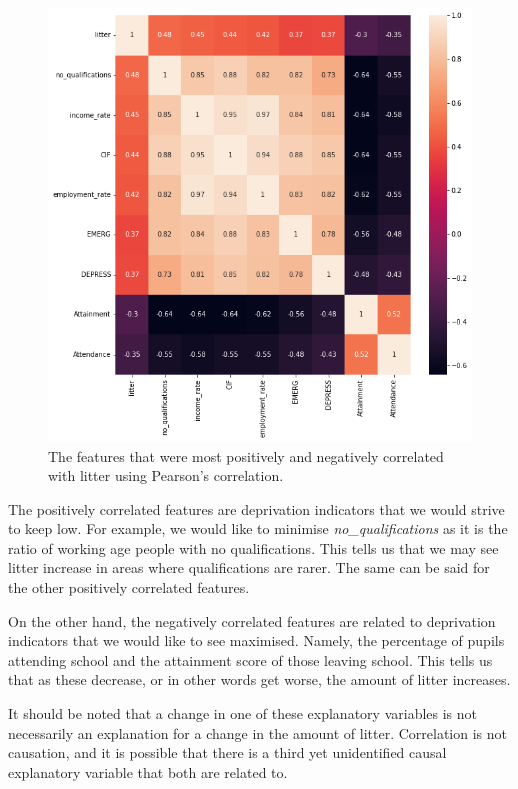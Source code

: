 \documentclass{thesis}
\begin{document}
\begin{figure}[h!]
    \centering
    \includegraphics[scale=0.45]{images/corr-matrix.png}
    \caption{The features that were most positively and negatively correlated with litter using Pearson's correlation.}
    \label{fig:correlation-matrix}
\end{figure}

The positively correlated features are deprivation indicators that we would strive to keep low. For example, we would like to minimise \textit{no\_qualifications} as it is the ratio of working age people with no qualifications. This tells us that we may see litter increase in areas where qualifications are rarer. The same can be said for the other positively correlated features.

On the other hand, the negatively correlated features are related to deprivation indicators that we would like to see maximised. Namely, the percentage of pupils attending school and the attainment score of those leaving school. This tells us that as these decrease, or in other words get worse, the amount of litter increases.

It should be noted that a change in one of these explanatory variables is not necessarily an explanation for a change in the amount of litter. Correlation is not causation, and it is possible that there is a third yet unidentified causal explanatory variable that both are related to.
\end{document}
